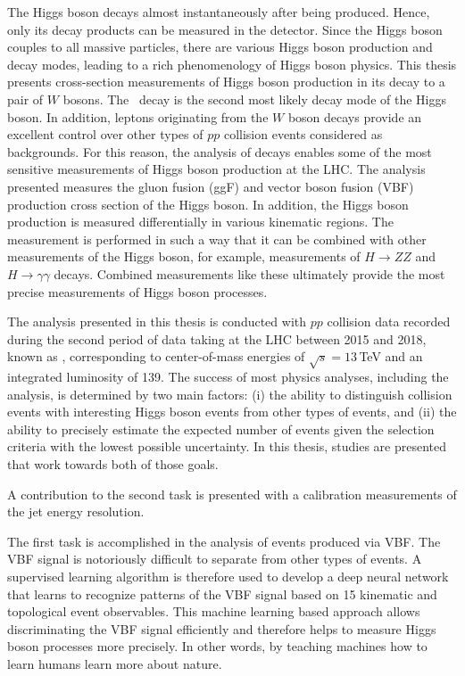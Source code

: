 The Higgs boson decays almost instantaneously after being produced. Hence, only its decay products can be measured in the detector. Since the Higgs boson couples to all massive particles, there are various Higgs boson production and decay modes, leading to a rich phenomenology of Higgs boson physics. 
This thesis presents cross-section measurements of Higgs boson production in its decay to a pair of $W$ bosons.
The \HWW\ decay is the second most likely decay mode of the Higgs boson. In addition, leptons originating from the $W$ boson decays provide an excellent control over other types of $pp$ collision events considered as backgrounds.
For this reason, the analysis of \HWWdet decays enables some of the most sensitive measurements of Higgs boson production at the LHC.
The analysis presented measures the gluon fusion (ggF) and vector boson fusion (VBF) production cross section of the Higgs boson.
In addition, the Higgs boson production is measured differentially in various kinematic regions. 
The measurement is performed in such a way that it can be combined with other measurements of the Higgs boson, for example, measurements of $H \to ZZ$ and $H \to \gamma\gamma$ decays. 
Combined measurements like these ultimately provide the most precise measurements of Higgs boson processes.

The \HWWdet analysis presented in this thesis is conducted with $pp$ collision data recorded during the second period of data taking at the LHC between 2015 and 2018, known as \RunTwo, corresponding to center-of-mass energies of $\sqrt{s} = 13\,$TeV and an integrated luminosity of 139\ifb.
The success of most physics analyses, including the \HWWdet analysis, is determined by two main factors: 
(i) the ability to distinguish collision events with interesting Higgs boson events from other types of events, and (ii) the ability to precisely estimate the expected number of events given the selection criteria with the lowest possible uncertainty.
In this thesis, studies are presented that work towards both of those goals.

A contribution to the second task is presented with a calibration measurements of the jet energy resolution. 

The first task is accomplished in the analysis of \HWWdet events produced via VBF.
The VBF signal is notoriously difficult to separate from other types of events. 
A supervised learning algorithm is therefore used to develop a deep neural network that learns to recognize patterns of the VBF signal based on 15 kinematic and topological event observables. 
This machine learning based approach allows discriminating the VBF signal efficiently and therefore helps to measure Higgs boson processes more precisely. 
In other words, by teaching machines how to learn humans learn more about nature. 




